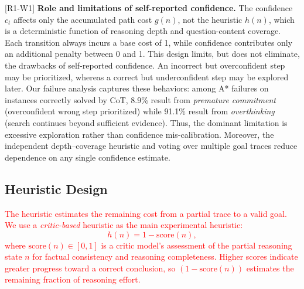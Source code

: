 \documentclass[11pt]{article}
\begin{document}
\textcolor{reviewergreen}{[R1-W1] \textbf{Role and limitations of self-reported confidence.} The confidence $c_t$ affects only the accumulated path cost $g(n)$, not the heuristic $h(n)$, which is a deterministic function of reasoning depth and question-content coverage. Each transition always incurs a base cost of 1, while confidence contributes only an additional penalty between 0 and 1. This design limits, but does not eliminate, the drawbacks of self-reported confidence. An incorrect but overconfident step may be prioritized, whereas a correct but underconfident step may be explored later. Our failure analysis captures these behaviors: among A* failures on instances correctly solved by CoT, 8.9\% result from \emph{premature commitment} (overconfident wrong step prioritized) while 91.1\% result from \emph{overthinking} (search continues beyond sufficient evidence). Thus, the dominant limitation is excessive exploration rather than confidence mis-calibration. Moreover, the independent depth--coverage heuristic and voting over multiple goal traces reduce dependence on any single confidence estimate.}

\subsection{Heuristic Design}
\label{sec:heuristic}

\textcolor{red}{The heuristic estimates the remaining cost from a partial trace to a valid goal. We use a \emph{critic-based} heuristic as the main experimental heuristic:
\begin{equation}
h(n) = 1 - \text{score}(n),
\label{eq:heuristic}
\end{equation}
where $\text{score}(n) \in [0,1]$ is a critic model's assessment of the partial reasoning state $n$ for factual consistency and reasoning completeness. Higher scores indicate greater progress toward a correct conclusion, so $(1 - \text{score}(n))$ estimates the remaining fraction of reasoning effort.}
\end{document}
